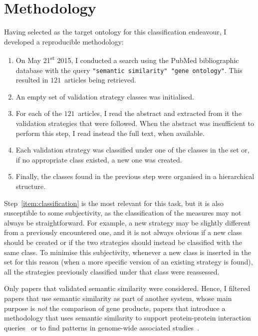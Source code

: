 \section{Methodology} \label{sec:validation/methodology}

Having selected  as the target ontology for this classification endeavour, I developed a reproducible methodology:
\begin{enumerate}
    \item On May 21\textsuperscript{st} 2015, I conducted a search using the PubMed bibliographic database with the query \texttt{"semantic similarity" "gene ontology"}. This resulted in $121$~articles being retrieved.
    \item An empty set of validation strategy classes was initialised.
    \item For each of the $121$~articles, I read the abstract and extracted from it the validation strategies that were followed. When the abstract was insufficient to perform this step, I read instead the full text, when available.
    \item Each validation strategy was classified under one of the classes in the set or, if no appropriate class existed, a new one was created. \label{item:classification}
    \item Finally, the classes found in the previous step were organised in a hierarchical structure.
\end{enumerate}

Step~\ref{item:classification} is the most relevant for this task, but it is also susceptible to some subjectivity, as the classification of the measures may not always be straightforward. For example, a new strategy may be slightly different from a previously encountered one, and it is not always obvious if a new class should be created or if the two strategies should instead be classified with the same class. To minimise this subjectivity, whenever a new class is inserted in the set for this reason (\ie when a more specific version of an existing strategy is found), all the strategies previously classified under that class were reassessed.

Only papers that validated semantic similarity were considered. Hence, I filtered papers that use semantic similarity as part of another system, whose main purpose is \emph{not} the comparison of gene products, \eg papers that introduce a methodology that uses semantic similarity to support protein-protein interaction queries~\citep{Guzzi2013} or to find patterns in genome-wide associated studies~\citep{Kim2013}.


